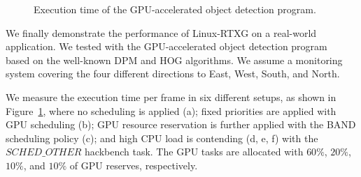 \begin{figure}[!t]
\begin{minipage}[t]{0.33\hsize}
\begin{center}
\label{fig:real-prio_band-hiload}
\end{center}
\end{minipage}
\begin{minipage}[t]{0.33\hsize}
\begin{center}
\label{fig:real-null_null-hiload}
\label{fig:real-prio_band_cpu-hiload}
\end{center}
\end{minipage}
\caption{Execution time of the GPU-accelerated object detection program.}
\label{fig:elapse_time_all}
\end{figure}

We finally demonstrate the performance of Linux-RTXG on a real-world
application.
We tested with the GPU-accelerated object detection
program~\cite{hirabayashi:cpsna2013} based on the well-known DPM and HOG
algorithms.
We assume a monitoring system covering the four different directions to
East, West, South, and North.

We measure the execution time per frame in six different setups, as
shown in Figure~\ref{fig:elapse_time_all}, where no scheduling is
applied (a); fixed priorities are applied with GPU scheduling (b); GPU
resource reservation is further applied with the BAND scheduling policy
(c); and high CPU load is contending (d, e, f) with the $SCHED\_OTHER$
hackbench task.
The GPU tasks are allocated with $60\%$, $20\%$, $10\%$, and $10\%$ of
GPU reserves, respectively.

